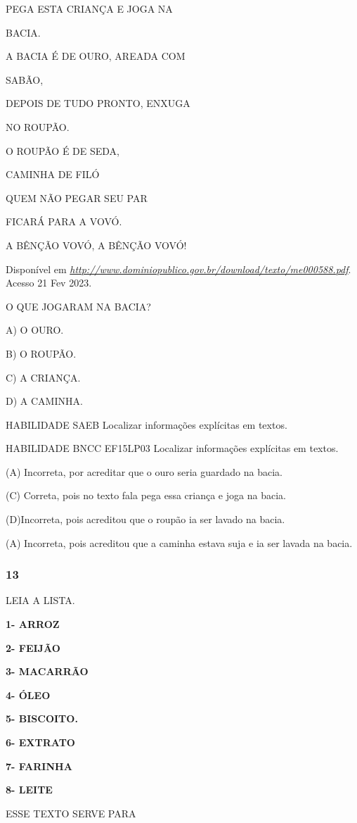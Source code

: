 PEGA ESTA CRIANÇA E JOGA NA

BACIA.

A BACIA É DE OURO, AREADA COM

SABÃO,

DEPOIS DE TUDO PRONTO, ENXUGA

NO ROUPÃO.

O ROUPÃO É DE SEDA,

CAMINHA DE FILÓ

QUEM NÃO PEGAR SEU PAR

FICARÁ PARA A VOVÓ.

A BÊNÇÃO VOVÓ, A BÊNÇÃO VOVÓ!

Disponível em
\href{http://www.dominiopublico.gov.br/download/texto/me000588.pdf}{\emph{http://www.dominiopublico.gov.br/download/texto/me000588.pdf}}.
Acesso 21 Fev 2023.

O QUE JOGARAM NA BACIA?

A) O OURO.

B) O ROUPÃO.

C) A CRIANÇA.

D) A CAMINHA.

HABILIDADE SAEB Localizar informações explícitas em textos.

HABILIDADE BNCC EF15LP03 Localizar informações explícitas em textos.

(A) Incorreta, por acreditar que o ouro seria guardado na bacia.

(C) Correta, pois no texto fala pega essa criança e joga na bacia.

(D)Incorreta, pois acreditou que o roupão ia ser lavado na bacia.

(A) Incorreta, pois acreditou que a caminha estava suja e ia ser lavada
na bacia.

\subsubsection{13 }\label{section-69}

LEIA A LISTA.

\textbf{1- ARROZ}

\textbf{2- FEIJÃO}

\textbf{3- MACARRÃO}

\textbf{4- ÓLEO}

\textbf{5- BISCOITO.}

\textbf{6- EXTRATO}

\textbf{7- FARINHA}

\textbf{8- LEITE}

ESSE TEXTO SERVE PARA

